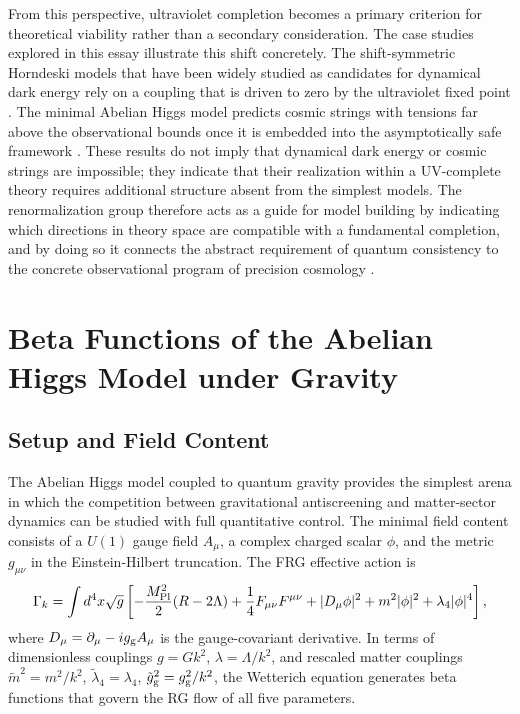 \documentclass[12pt,a4paper]{article}
\begin{document}
From this perspective, ultraviolet completion becomes a primary criterion for
theoretical viability rather than a secondary consideration. The case studies
explored in this essay illustrate this shift concretely. The shift-symmetric
Horndeski models that have been widely studied as candidates for dynamical dark
energy rely on a coupling that is driven to zero by the ultraviolet fixed point
\cite{EichhornLinoWagner2023}. The minimal Abelian Higgs model predicts cosmic
strings with tensions far above the observational bounds once it is embedded
into the asymptotically safe framework \cite{EichhornLinoMiqueleto2023}. These
results do not imply that dynamical dark energy or cosmic strings are impossible;
they indicate that their realization within a UV-complete theory requires
additional structure absent from the simplest models. The renormalization group
therefore acts as a guide for model building by indicating which directions in
theory space are compatible with a fundamental completion, and by doing so it
connects the abstract requirement of quantum consistency to the concrete
observational program of precision cosmology \cite{Planck2018,NANOGrav2023,
BuoninfanteEtal2025}.

\section{Beta Functions of the Abelian Higgs Model under Gravity}
\label{sec:abelian_beta}

\subsection{Setup and Field Content}

The Abelian Higgs model coupled to quantum gravity provides the simplest
arena in which the competition between gravitational antiscreening and
matter-sector dynamics can be studied with full quantitative control. The
minimal field content consists of a $U(1)$ gauge field $A_\mu$, a complex
charged scalar $\phi$, and the metric $g_{\mu\nu}$ in the Einstein-Hilbert
truncation. The FRG effective action is \cite{EichhornLinoMiqueleto2023}
\begin{equation}
\Gamma_k = \int d^4x\sqrt{g}\left[
-\frac{M_{\rm Pl}^2}{2}(R - 2\Lambda)
+ \frac{1}{4}F_{\mu\nu}F^{\mu\nu}
+ |D_\mu\phi|^2 + m^2|\phi|^2 + \lambda_4|\phi|^4
\right],
\end{equation}
where $D_\mu = \partial_\mu - ig_{\rm g}A_\mu$ is the gauge-covariant
derivative. In terms of dimensionless couplings $g = G k^2$, $\lambda = \Lambda/k^2$,
and rescaled matter couplings $\tilde m^2 = m^2/k^2$, $\tilde\lambda_4 = \lambda_4$,
$\tilde g_{\rm g}^2 = g_{\rm g}^2/k^2$, the Wetterich equation generates beta
functions that govern the RG flow of all five parameters.
\end{document}
